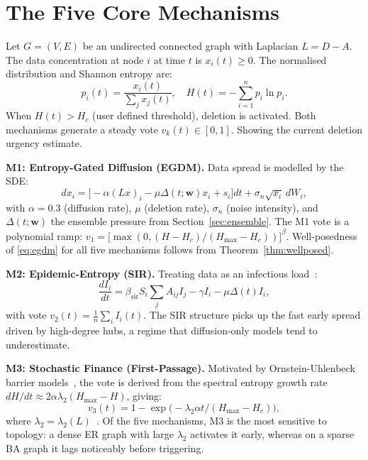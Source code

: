 \documentclass[conference]{IEEEtran}
\newcommand{\bfw}{\mathbf{w}}
\newcommand{\Hc}{H_c}
\newcommand{\Hmax}{H_{\max}}
\newcommand{\lambdat}{\lambda_2}
\begin{document}
\section{The Five Core Mechanisms}
\label{sec:mechanisms}

Let $G=(V,E)$ be an undirected connected graph with Laplacian $L=D-A$.
The data concentration at node $i$ at time $t$ is $x_i(t)\geq 0$.
The normalised distribution and Shannon entropy are:
\begin{equation}
  p_i(t)=\frac{x_i(t)}{\sum_j x_j(t)},\quad
  H(t)=-\sum_{i=1}^n p_i\ln p_i.
  \label{eq:entropy}
\end{equation}
When $H(t) > \Hc$ (user defined threshold), deletion is activated.
Both mechanisms generate a steady vote $v_k(t)\in[0,1]$.
Showing the current deletion urgency estimate.

\textbf{M1: Entropy-Gated Diffusion (EGDM).}
Data spread is modelled by the SDE:
\begin{equation}
  dx_i=\bigl[-\alpha(Lx)_i-\mu\Delta(t;\bfw)x_i+s_i\bigr]dt
       +\sigma_n\sqrt{x_i}\,dW_i,
  \label{eq:egdm}
\end{equation}
with $\alpha=0.3$ (diffusion rate), $\mu$ (deletion rate),
$\sigma_n$ (noise intensity), and $\Delta(t;\bfw)$ the ensemble
pressure from Section~\ref{sec:ensemble}. The M1 vote is a
polynomial ramp:
$v_1=\bigl[\max(0,(H-\Hc)/(\Hmax-\Hc))\bigr]^\beta$.
Well-posedness of \eqref{eq:egdm} for all five mechanisms follows
from Theorem~\ref{thm:wellposed}.

\textbf{M2: Epidemic-Entropy (SIR).}
Treating data as an infectious load~\cite{pastor2015epidemic,
sailaja2025stochastic}:
\begin{equation}
  \frac{dI_i}{dt}=\beta_{\mathrm{sir}}S_i\sum_j A_{ij}I_j
                  -\gamma I_i-\mu\Delta(t)I_i,
\end{equation}
with vote $v_2(t)=\tfrac{1}{n}\sum_i I_i(t)$. The SIR structure
picks up the fast early spread driven by high-degree hubs, a
regime that diffusion-only models tend to underestimate.

\textbf{M3: Stochastic Finance (First-Passage).}
Motivated by Ornstein-Uhlenbeck barrier
models~\cite{black1973pricing,mohan2025realtime}, the vote is
derived from the spectral entropy growth rate
$dH/dt\approx 2\alpha\lambdat(\Hmax-H)$, giving:
\[v_3(t)=1-\exp\!\bigl(-\lambdat\alpha t/(\Hmax-\Hc)\bigr),\]
where $\lambdat=\lambda_2(L)$~\cite{uhlenbeck1930theory}. Of the
five mechanisms, M3 is the most sensitive to topology: a dense
ER graph with large $\lambdat$ activates it early, whereas on a
sparse BA graph it lags noticeably before triggering.
\end{document}
